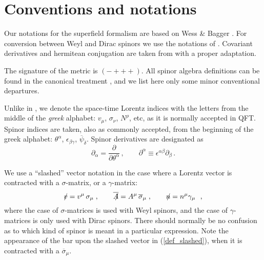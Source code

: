 \documentclass[12pt]{revtex4}
\newcommand{\slashed}[1]{\hbox{{$#1$}\llap{$/$}}}
\begin{document}
\section{Conventions and notations}
\label{app_conventions}

Our notations for the superfield formalism are based on 
Wess \& Bagger 
\cite{Wess:1992cp}.
For conversion between Weyl and Dirac spinors we use the notations
of 
\cite{Martin:1997ns}.
Covariant derivatives and hermitean conjugation are taken from
\cite{Gates:1983nr}
with a proper adaptation.

The signature of the metric is 
$ (-+++) $.
All spinor algebra definitions can be found in the canonical treatment
\cite{Wess:1992cp},
and we list here only some minor conventional departures.

Unlike in \cite{Wess:1992cp}, we denote the space-time Lorentz
indices with the letters from the middle of the \emph{greek}
alphabet:
$ v_\mu $, $ \sigma_\nu $, $ N^\rho $, etc,
as it is normally accepted in QFT.
Spinor indices are taken, also as commonly accepted, from the
beginning of the greek alphabet:
$ \theta^\alpha $, $ \epsilon_{\beta\gamma} $, 
$ \overline{\psi}_{\dot\delta}$.
Spinor derivatives are designated as
\[
\partial_\alpha = \frac{\partial}{\partial\theta^\alpha}\,,
\qquad
\partial^\alpha \equiv \epsilon^{\alpha\beta}\partial_\beta
\,.
\]

We use a ``slashed'' vector notation in the case where a Lorentz
vector is contracted with a $ \sigma $-matrix, or a $ \gamma $-matrix:
\begin{equation}
\label{def_slashed}
\slashed{v} = v^\mu\, \sigma_\mu\;, \qquad
\overline{\slashed{A}} = A^\mu\, \overline{\sigma}_\mu\;, \qquad
\slashed{n} = n^\mu \gamma_\mu~~,
\end{equation}
where the case of $ \sigma $-matrices is used with Weyl spinors, and
the case of $ \gamma $-matrices is only used with Dirac spinors. 
There should normally be no confusion as to which kind of spinor is
meant in a particular expression.
Note the appearance of the bar upon the slashed vector in
(\ref{def_slashed}), when it
is contracted with a $ \overline{\sigma}_\mu $.
\end{document}
